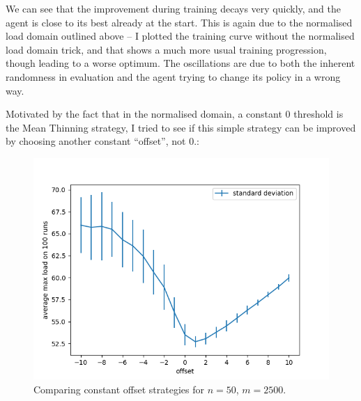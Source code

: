We can see that the improvement during training decays very quickly, and the agent is close to its best already at the start. This is again due to the normalised load domain outlined above -- I plotted the training curve without the normalised load domain trick, and that shows a much more usual training progression, though leading to a worse optimum. The oscillations are due to both the inherent randomness in evaluation and the agent trying to change its policy in a wrong way.


Motivated by the fact that in the normalised domain, a constant $0$ threshold is the Mean Thinning strategy, I tried to see if this simple strategy can be improved by choosing another constant ``offset'', not $0$.:

\begin{figure}[hbt!] \label{two-thinning-constant-offset}
    \centering
    \includegraphics[scale=1.0]{Chapter4/Figs/offset_analysis_50_2500.png}
    \caption{Comparing constant offset strategies for $n=50$, $m=2500$.}
\end{figure}



